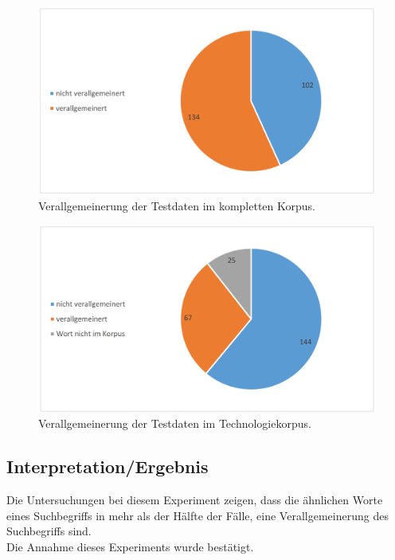 \documentclass[12pt,a4paper]{report}
\begin{document}
\begin{figure}[p]
  \begin{center}
	\includegraphics[scale=0.4]{VerallgemeinerungFull.PNG}
  \end{center}  
  \caption{Verallgemeinerung der Testdaten im kompletten Korpus.}

\end{figure}
\begin{figure}[p]
  \begin{center}
	\includegraphics[scale=0.4]{VerallgemeinerungTech.PNG}
  \end{center}  
  \caption{Verallgemeinerung der Testdaten im Technologiekorpus.}
  \end{figure}	
		\subsection{Interpretation/Ergebnis}
		Die Untersuchungen bei diesem Experiment zeigen, dass die ähnlichen Worte eines Suchbegriffs in mehr als der Hälfte der Fälle, eine Verallgemeinerung des Suchbegriffs sind. \\
		Die Annahme dieses Experiments wurde bestätigt.\\
		
\end{document}
